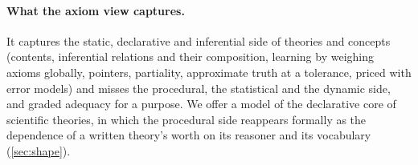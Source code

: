 \paragraph{What the axiom view captures.}
It captures the static, declarative and inferential side of theories and concepts (contents, inferential relations and their composition, learning by weighing axioms globally, pointers, partiality, approximate truth at a tolerance, priced with error models) and misses the procedural, the statistical and the dynamic side, and graded adequacy for a purpose. We offer a model of the declarative core of scientific theories, in which the procedural side reappears formally as the dependence of a written theory's worth on its reasoner and its vocabulary (\cref{sec:shape}).
